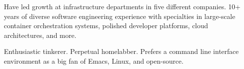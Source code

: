 

\begin{cvparagraph}

Have led growth at infrastructure departments in five different companies. 10+ years of diverse software engineering experience with specialties in large-scale container orchestration systems, polished developer platforms, cloud architectures, and more.

Enthusiastic tinkerer. Perpetual homelabber. Prefers a command line interface environment as a big fan of Emacs, Linux, and open-source.
\end{cvparagraph}
